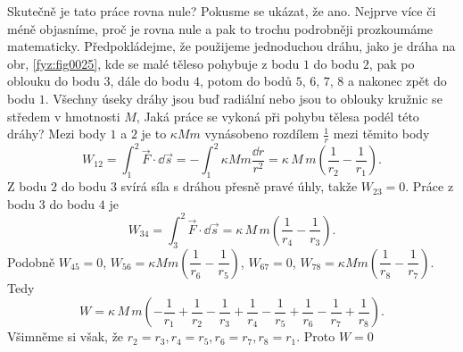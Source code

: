     Skutečně je tato práce rovna nule? Pokusme se ukázat, že ano. Nejprve více či méně objasníme, 
    proč je rovna nule a pak to trochu podrobněji prozkoumáme matematicky. Předpokládejme, že 
    použijeme jednoduchou dráhu, jako je dráha na obr, \ref{fyz:fig0025}, kde se malé těleso 
    pohybuje z bodu \(1\) do bodu \(2\), pak po oblouku do bodu \(3\), dále do bodu \(4\), potom do 
    bodů \(5\), \(6\), \(7\), \(8\)  a nakonec zpět do bodu \(1\). Všechny úseky dráhy jsou buď 
    radiální nebo jsou to oblouky kružnic se středem v hmotnosti \(M\), Jaká práce se vykoná při 
    pohybu tělesa podél této dráhy? Mezi body \(1\) a \(2\) je to \(\kappa Mm\) vynásobeno rozdílem 
    \(\frac{1}{r}\) mezi těmito body
    \begin{equation*}
      W_{12} = \int_{1}^{2}\vec{F}\cdot\dd{\vec{s}} = 
             - \int_{1}^{2}\kappa Mm\frac{\dd{r}}{r^2}
             = \kappa\,M\,m\left(\dfrac{1}{r_2} - \dfrac{1}{r_1}\right).
    \end{equation*} 
    Z bodu \(2\) do bodu \(3\) svírá síla s dráhou přesně pravé úhly, takže \(W_{23} = 0\). Práce z 
    bodu \(3\) do bodu \(4\) je
    \begin{equation*}
      W_{34} = \int_{3}^{2}\vec{F}\cdot\dd{\vec{s}}
             = \kappa\,M\,m\left(\dfrac{1}{r_4} - \dfrac{1}{r_3}\right).
    \end{equation*} 
    Podobně \(W_{45} = 0\), \(W_{56} = \kappa Mm\left(\dfrac{1}{r_6} - \dfrac{1}{r_5}\right)\),
    \(W_{67}=0\), \(W_{78} = \kappa Mm\left(\dfrac{1}{r_8} - \dfrac{1}{r_7}\right)\). Tedy
    \begin{equation*}
      W = \kappa\,M\,m\left(-\dfrac{1}{r_1} + \dfrac{1}{r_2} 
                            -\dfrac{1}{r_3} + \dfrac{1}{r_4}
                            -\dfrac{1}{r_5} + \dfrac{1}{r_6}
                            -\dfrac{1}{r_7} + \dfrac{1}{r_8}\right).
    \end{equation*} 
    Všimněme si však, že \(r_2 = r_3, r_4 = r_5, r_6 = r_7, r_8 = r_1\). Proto \(W = 0\)
    
